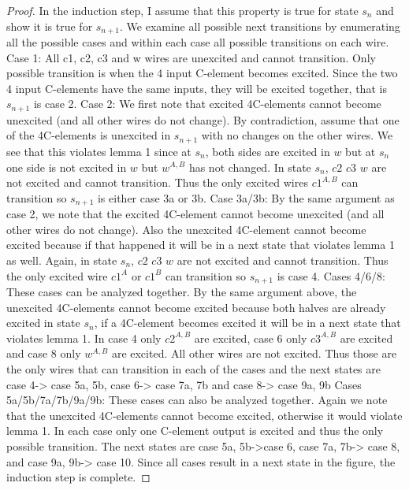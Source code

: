 \documentclass{article}
\begin{document}
\begin{proof}
In the induction step, I assume that this property is true for state $s_n$ and show it is true for $s_{n+1}$.  \newline
We examine all possible next transitions by enumerating all the possible cases and within each case all possible transitions on each wire. \newline
Case 1:  All c1, c2, c3 and w wires are unexcited and cannot transition.  Only possible transition is when the 4 input C-element becomes excited.  Since the two 4 input C-elements have the same inputs, they will be excited together, that is $s_{n+1}$ is case 2.\newline
Case 2:  We first note that excited 4C-elements cannot become unexcited (and all other wires do not change).  By contradiction, assume that one of the 4C-elements is unexcited in $s_{n+1}$ with no changes on the other wires.  We see that this violates lemma 1 since at $s_n$, both sides are excited in $w$ but at $s_n$ one side is not excited in $w$ but $w^{A,B}$ has not changed.  In state $s_n$, $c2$ $c3$ $w$ are not excited and cannot transition.  Thus the only excited wires $c1^{A,B}$ can transition so $s_{n+1}$ is either case 3a or 3b. \newline
Case 3a/3b:  By the same argument as case 2, we note that the excited 4C-element cannot become unexcited (and all other wires do not change).  Also the unexcited 4C-element cannot become excited because if that happened it will be in a next state that violates lemma 1 as well.  Again, in state $s_n$, $c2$ $c3$ $w$ are not excited and cannot transition.  Thus the only excited wire $c1^{A}$ or $c1^{B}$ can transition so $s_{n+1}$ is case 4. \newline
Cases 4/6/8:  These cases can be analyzed together.  By the same argument above, the unexcited 4C-elements cannot become excited because both halves are already excited in state $s_n$, if a 4C-element becomes excited it will be in a next state that violates lemma 1.  In case 4 only $c2^{A,B}$ are excited, case 6 only $c3^{A,B}$ are excited and case 8 only $w^{A,B}$ are excited.  All other wires are not excited.  Thus those are the only wires that can transition in each of the cases and the next states are case 4-> case 5a, 5b, case 6-> case 7a, 7b and case 8-> case 9a, 9b
\newline
Cases 5a/5b/7a/7b/9a/9b:  These cases can also be analyzed together.  Again we note that the unexcited 4C-elements cannot become excited, otherwise it would violate lemma 1.  In each case only one C-element output is excited and thus the only possible transition.  The next states are case 5a, 5b->case 6, case 7a, 7b-> case 8, and case 9a, 9b-> case 10.
\newline
Since all cases result in a next state in the figure, the induction step is complete. \newline


\end{proof}
\end{document}
